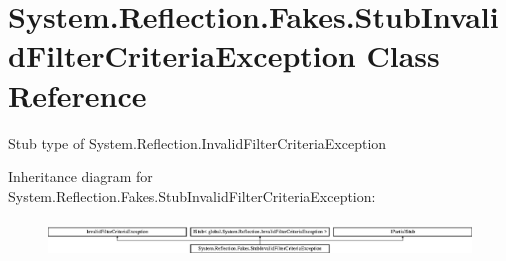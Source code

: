 \hypertarget{class_system_1_1_reflection_1_1_fakes_1_1_stub_invalid_filter_criteria_exception}{\section{System.\-Reflection.\-Fakes.\-Stub\-Invalid\-Filter\-Criteria\-Exception Class Reference}
\label{class_system_1_1_reflection_1_1_fakes_1_1_stub_invalid_filter_criteria_exception}
}


Stub type of System.\-Reflection.\-Invalid\-Filter\-Criteria\-Exception 


Inheritance diagram for System.\-Reflection.\-Fakes.\-Stub\-Invalid\-Filter\-Criteria\-Exception\-:\begin{figure}[H]
\begin{center}
\leavevmode
\includegraphics[height=0.990274cm]{class_system_1_1_reflection_1_1_fakes_1_1_stub_invalid_filter_criteria_exception}
\end{center}
\end{figure}
